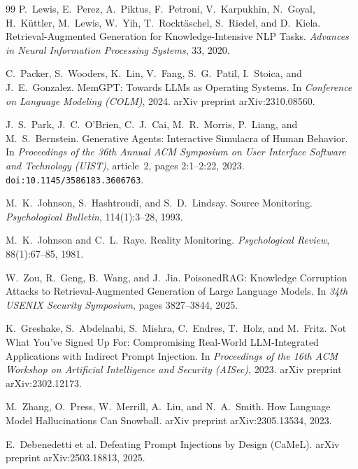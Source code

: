 \documentclass[11pt]{article}
\begin{document}
\begin{thebibliography}{99}
P.~Lewis, E.~Perez, A.~Piktus, F.~Petroni, V.~Karpukhin, N.~Goyal, H.~K\"uttler, M.~Lewis, W.~Yih, T.~Rockt\"aschel, S.~Riedel, and D.~Kiela.
\newblock Retrieval-Augmented Generation for Knowledge-Intensive NLP Tasks.
\newblock \emph{Advances in Neural Information Processing Systems}, 33, 2020.

C.~Packer, S.~Wooders, K.~Lin, V.~Fang, S.~G.~Patil, I.~Stoica, and J.~E.~Gonzalez.
\newblock MemGPT: Towards LLMs as Operating Systems.
\newblock In \emph{Conference on Language Modeling (COLM)}, 2024.
\newblock arXiv preprint arXiv:2310.08560.

J.~S.~Park, J.~C.~O'Brien, C.~J.~Cai, M.~R.~Morris, P.~Liang, and M.~S.~Bernstein.
\newblock Generative Agents: Interactive Simulacra of Human Behavior.
\newblock In \emph{Proceedings of the 36th Annual ACM Symposium on User Interface Software and Technology (UIST)}, article~2, pages 2:1--2:22, 2023.
\newblock \texttt{doi:10.1145/3586183.3606763}.

M.~K.~Johnson, S.~Hashtroudi, and S.~D.~Lindsay.
\newblock Source Monitoring.
\newblock \emph{Psychological Bulletin}, 114(1):3--28, 1993.

M.~K.~Johnson and C.~L.~Raye.
\newblock Reality Monitoring.
\newblock \emph{Psychological Review}, 88(1):67--85, 1981.

W.~Zou, R.~Geng, B.~Wang, and J.~Jia.
\newblock PoisonedRAG: Knowledge Corruption Attacks to Retrieval-Augmented Generation of Large Language Models.
\newblock In \emph{34th USENIX Security Symposium}, pages 3827--3844, 2025.

K.~Greshake, S.~Abdelnabi, S.~Mishra, C.~Endres, T.~Holz, and M.~Fritz.
\newblock Not What You've Signed Up For: Compromising Real-World LLM-Integrated Applications with Indirect Prompt Injection.
\newblock In \emph{Proceedings of the 16th ACM Workshop on Artificial Intelligence and Security (AISec)}, 2023.
\newblock arXiv preprint arXiv:2302.12173.

M.~Zhang, O.~Press, W.~Merrill, A.~Liu, and N.~A.~Smith.
\newblock How Language Model Hallucinations Can Snowball.
\newblock arXiv preprint arXiv:2305.13534, 2023.

E.~Debenedetti et al.
\newblock Defeating Prompt Injections by Design (CaMeL).
\newblock arXiv preprint arXiv:2503.18813, 2025.


\end{thebibliography}
\end{document}
